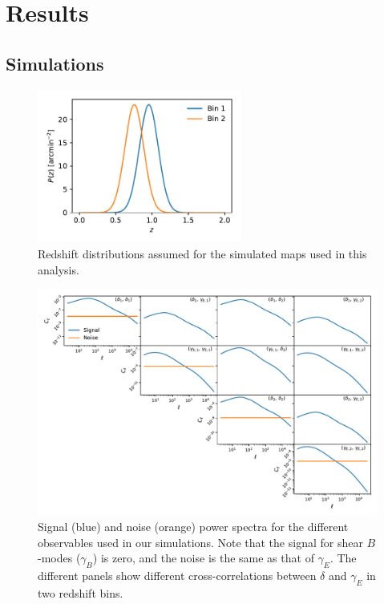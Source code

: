 \documentclass[a4paper,11pt]{article}
\begin{document}
  \section{Results}\label{sec:results}
    \subsection{Simulations}\label{ssec:results.sims}
      \begin{figure}
        \centering
        \includegraphics[width=0.6\textwidth]{./figures/pz.pdf}
        \caption{Redshift distributions assumed for the simulated maps used in this analysis.}
        \label{fig:pz}
      \end{figure}

      \begin{figure}
        \centering
        \includegraphics[width=\textwidth]{./figures/cls-sph-2b.pdf}
        \caption{Signal (blue) and noise (orange) power spectra for the different observables used in our simulations. Note that the signal for shear $B$-modes ($\gamma_B$) is zero, and the noise is the same as that of $\gamma_E$. The different panels show different cross-correlations between $\delta$ and $\gamma_E$ in two redshift bins.}
        \label{fig:cl-2bins}
      \end{figure}
      
\end{document}
